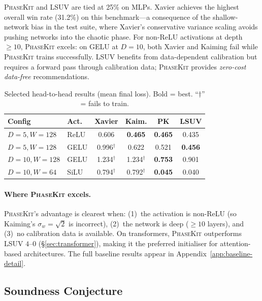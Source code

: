 \documentclass[10pt]{article}
\newcommand{\ToolName}{\textsc{PhaseKit}}
\begin{document}
\ToolName{} and LSUV are tied at 25\% on MLPs.
Xavier achieves the highest overall win rate (31.2\%) on this benchmark---a consequence of the shallow-network bias in the test suite, where Xavier's conservative variance scaling avoids pushing networks into the chaotic phase.
For non-ReLU activations at depth~$\geq 10$, \ToolName{} excels: on GELU at $D=10$, both Xavier and Kaiming fail while \ToolName{} trains successfully.
LSUV benefits from data-dependent calibration but requires a forward pass through calibration data; \ToolName{} provides \emph{zero-cost data-free} recommendations.

\begin{table}[t]
\centering
\caption{Selected head-to-head results (mean final loss). Bold = best. ``$\dagger$'' = fails to train.}
\label{tab:baseline-comparison}
\small
\begin{tabular}{@{}llcccc@{}}
\toprule
\textbf{Config} & \textbf{Act.} & \textbf{Xavier} & \textbf{Kaim.} & \textbf{PK} & \textbf{LSUV} \\
\midrule
$D\!=\!5, W\!=\!128$  & ReLU & 0.606 & \textbf{0.465} & \textbf{0.465} & 0.435 \\
$D\!=\!5, W\!=\!128$  & GELU & 0.996$^\dagger$ & 0.622 & 0.521 & \textbf{0.456} \\
$D\!=\!10, W\!=\!128$ & GELU & 1.234$^\dagger$ & 1.234$^\dagger$ & \textbf{0.753} & 0.901 \\
$D\!=\!10, W\!=\!64$  & SiLU & 0.794$^\dagger$ & 0.792$^\dagger$ & \textbf{0.045} & 0.040 \\
\bottomrule
\end{tabular}
\end{table}

\paragraph{Where \ToolName{} excels.}
\ToolName{}'s advantage is clearest when: (1)~the activation is non-ReLU (so Kaiming's $\sigma_w = \sqrt{2}$ is incorrect), (2)~the network is deep ($\geq 10$ layers), and (3)~no calibration data is available.
On transformers, \ToolName{} outperforms LSUV $4$--$0$ (\S\ref{sec:transformer}), making it the preferred initialiser for attention-based architectures.
The full baseline results appear in Appendix~\ref{app:baseline-detail}.

\subsection{Soundness Conjecture}
\label{sec:soundness}
\end{document}
